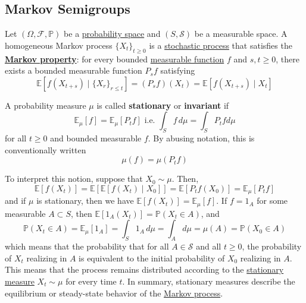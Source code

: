 \subsection{Markov Semigroups}

  \begin{definition}
    \label{def:markov-process}
  Let $(\Omega, \mathcal{F}, \mathbb{P})$ be a \hyperref[prob-def:probability-space]{probability space} and $(S, \mathcal{S})$ be a measurable space. A homogeneous Markov process $\{X_t\}_{t \geq 0}$ is a \hyperref[sp-def:stochastic-process]{stochastic process} that satisfies the \textbf{\hyperref[sp-def:markov-property]{Markov property}}: for every bounded \hyperref[mt-def:measurable-function]{measurable function} $f$ and $s, t \geq 0$, there exists a bounded measurable function $P_s f$ satisfying 
  \begin{equation}
    \mathbb{E}[f (X_{t + s}) \mid \{X_r\}_{r \leq t}] = (P_s f) (X_t) = \mathbb{E}[ f(X_{t + s}) \mid X_t]
  \end{equation}
  \end{definition}

  \begin{definition}
    \label{def:stationary-measure}
  A probability measure $\mu$ is called \textbf{stationary} or \textbf{invariant} if 
  \begin{equation}
    \mathbb{E}_\mu[f] = \mathbb{E}_\mu [P_t f] \text{ i.e. } \int_S f \,d \mu = \int_S P_t f d\mu
  \end{equation}
  for all $t \geq 0$ and bounded measurable $f$. By abusing notation, this is conventionally written 
  \begin{equation}
    \mu(f) = \mu(P_t f)
  \end{equation}
  \end{definition}

  To interpret this notion, suppose that $X_0 \sim \mu$. Then, 
  \begin{equation}
    \mathbb{E}[f(X_t)] = \mathbb{E}[\mathbb{E}[f(X_t) \mid X_0]] = \mathbb{E}[P_t f (X_0)] = \mathbb{E}_\mu [P_t f]
  \end{equation}
  and if $\mu$ is stationary, then we have $\mathbb{E}[f(X_t)] = \mathbb{E}_\mu [f]$. If $f = 1_A$ for some measurable $A \subset S$, then $\mathbb{E}[1_A (X_t)] = \mathbb{P}(X_t \in A)$, and 
  \begin{equation}
    \mathbb{P}(X_t \in A) = \mathbb{E}_\mu [1_A] = \int_S 1_A \,d\mu = \int_A d\mu = \mu(A) = \mathbb{P}(X_0 \in A)
  \end{equation}
  which means that the probability that for all $A \in \mathcal{S}$ and all $t \geq 0$, the probability of $X_t$ realizing in $A$ is equivalent to the initial probability of $X_0$ realizing in $A$. This means that the process remains distributed according to the \hyperref[def:stationary-measure]{stationary measure} $X_t \sim \mu$ for every time $t$. In summary, stationary measures describe the equilibrium or steady-state behavior of the \hyperref[def:markov-process]{Markov process}.  

